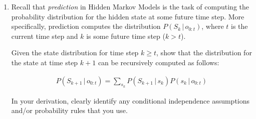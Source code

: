 \documentclass[12pt]{article}
\begin{document}
\begin{enumerate}[font=\Large,label=(\alph*)]
\begin{center}
\end{center}

You observed that the price of olive oil was normal in week $0$, high in week $1$, and high in week $2$. Execute the Forward Backward Algorithm to determine the probability distribution for the hidden state at each of weeks $0$, $1$, and $2$. That is, calculate $P(S_0 \,|\, O_0=1 \land O_1=2 \land O_2=2)$, $P(S_1 \,|\, O_0=1 \land O_1=2 \land O_2=2)$, and \\ $P(S_2 \,|\, O_0=1 \land O_1=2 \land O_2=2)$. Normalize each forward message. Show all calculations and round each calculation to $4$ decimal places. 

\begin{markscheme}

(10 marks) Correct execution of the Forward Backward Algorithm

(2 marks) \, Calculations are displayed clearly

\end{markscheme}

\begin{sol}
    {\color{blue} 

        Refer to attached image

    }   
    \end{sol}

\item 
Recall that \textit{prediction} in Hidden Markov Models is the task of computing the probability distribution for the hidden state at some future time step. More specifically, prediction computes the distribution $P(S_k\,|\,o_{0:t})$, where $t$ is the current time step and $k$ is some future time step ($k > t$). 

Given the state distribution for time step $k \geq t$, show that the distribution for the state at time step $k + 1$ can be recursively computed as follows:

\begin{align*}
    P(S_{k+1}\,|\,o_{0:t}) = \sum_{s_k} P(S_{k+1}\,|\,s_k) P(s_k\,|\,o_{0:t})
\end{align*}

In your derivation, clearly identify any conditional independence assumptions and/or probability rules that you use.


\end{enumerate}
\end{document}
